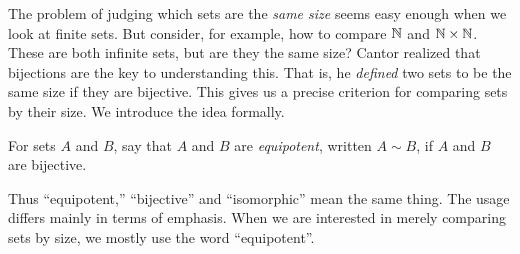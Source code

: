 %

The problem of judging which sets are the \emph{same size} seems easy enough when we look at finite sets. But consider, for example, how to compare $\mathbb N$ and $\mathbb N\times \mathbb N$. These are both infinite sets, but are they the same size?
Cantor realized that bijections are the key to understanding this. That is,
he \emph{defined} two sets to be the same size if they are bijective.
This gives us a precise criterion for comparing sets by their size. We introduce the idea formally.

\begin{defn}
	For sets $A$ and $B$, say that $A$ and $B$ are \emph{equipotent}, written $A\sim B$, if $A$ and $B$ are bijective.
\end{defn}

Thus ``equipotent,'' ``bijective'' and ``isomorphic'' mean the same thing.
The usage differs mainly in terms of emphasis.
When we are interested in merely comparing sets by size, we mostly use the word ``equipotent''. 

